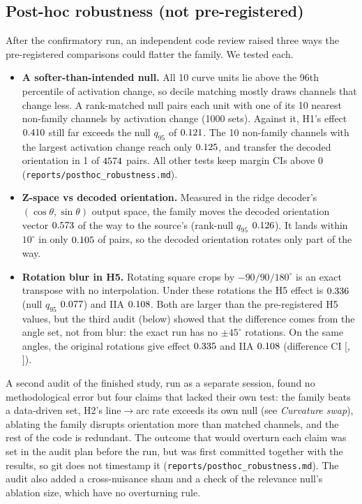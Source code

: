 \documentclass[11pt]{article}
\begin{document}
\subsection{Post-hoc robustness (not pre-registered)}
\label{sec:posthoc}
After the confirmatory run, an independent code review raised three ways the pre-registered comparisons could flatter the family. We tested each.
\begin{itemize}
\item \textbf{A softer-than-intended null.} All 10 curve units lie above the 96th percentile of activation change, so decile matching mostly draws channels that change less. A rank-matched null pairs each unit with one of its 10 nearest non-family channels by activation change (1000 sets). Against it, H1's effect $0.410$ still far exceeds the null $q_{95}$ of $0.121$. The 10 non-family channels with the largest activation change reach only $0.125$, and transfer the decoded orientation in 1 of $4574$ pairs. All other tests keep margin CIs above 0 (\texttt{reports/posthoc\_robustness.md}).
\item \textbf{Z-space vs decoded orientation.} Measured in the ridge decoder's $(\cos\theta,\sin\theta)$ output space, the family moves the decoded orientation vector $0.573$ of the way to the source's (rank-null $q_{95}$ $0.126$). It lands within $10^\circ$ in only $0.105$ of pairs, so the decoded orientation rotates only part of the way.
\item \textbf{Rotation blur in H5.} Rotating square crops by $-90/90/180^\circ$ is an exact transpose with no interpolation. Under these rotations the H5 effect is $0.336$ (null $q_{95}$ $0.077$) and IIA $0.108$. Both are larger than the pre-registered H5 values, but the third audit (below) showed that the difference comes from the angle set, not from blur: the exact run has no $\pm45^\circ$ rotations. On the same angles, the original rotations give effect $0.335$ and IIA $0.108$ (difference CI [\TrBlurDiffLo, \TrBlurDiffHi]).
\end{itemize}
A second audit of the finished study, run as a separate session, found no methodological error but four claims that lacked their own test: the family beats a data-driven set, H2's line$\to$arc rate exceeds its own null (see \emph{Curvature swap}), ablating the family disrupts orientation more than matched channels, and the rest of the code is redundant. The outcome that would overturn each claim was set in the audit plan before the run, but was first committed together with the results, so git does not timestamp it (\texttt{reports/posthoc\_robustness.md}). The audit also added a cross-nuisance sham and a check of the relevance null's ablation size, which have no overturning rule.
\end{document}
